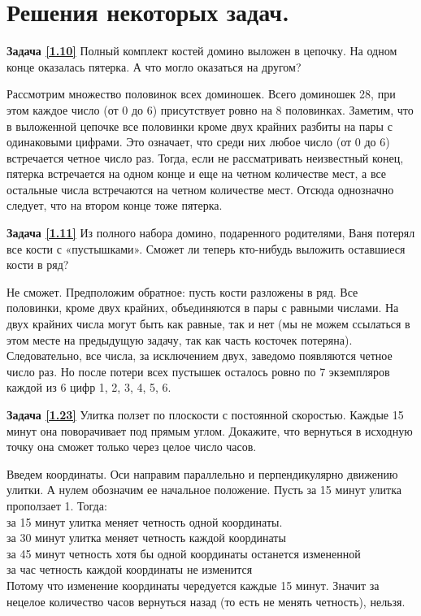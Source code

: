 \section{Решения некоторых задач.}

\textbf{Задача \ref{1.10}}
Полный комплект костей домино выложен в цепочку. На одном конце оказалась пятерка. А что могло оказаться на другом?


\begin{prf}
	Рассмотрим множество половинок всех доминошек. Всего доминошек 28, при этом каждое число (от 0 до 6) присутствует ровно на 8 половинках. Заметим, что в выложенной цепочке все половинки кроме двух крайних разбиты на пары с одинаковыми цифрами. Это означает, что среди них любое число (от 0 до 6) встречается четное число раз. Тогда, если не рассматривать неизвестный конец, пятерка встречается на одном конце и еще на четном количестве мест, а все остальные числа встречаются на четном количестве мест. Отсюда однозначно следует, что на втором конце тоже пятерка.
\end{prf}

\textbf{Задача \ref{1.11}}
Из полного набора домино, подаренного родителями, Ваня потерял все кости с «пустышками». Сможет ли теперь кто-нибудь выложить оставшиеся кости в ряд?

\begin{prf}
	Не сможет. Предположим обратное: пусть кости разложены в ряд. Все половинки, кроме двух крайних, объединяются в пары с равными числами. На двух крайних числа могут быть как равные, так и нет (мы не можем ссылаться в этом месте на предыдущую задачу, так как часть косточек потеряна). Следовательно, все числа, за исключением двух, заведомо появляются четное число раз. Но после потери всех пустышек осталось ровно по 7 экземпляров каждой из 6 цифр 1, 2, 3, 4, 5, 6. 
\end{prf}



\textbf{Задача \ref{1.23}}
Улитка ползет по плоскости с постоянной скоростью. Каждые 15 минут она поворачивает под прямым углом. Докажите, что вернуться в исходную точку она сможет только через целое число часов.
\begin{prf}
	Введем координаты. Оси направим параллельно и перпендикулярно движению улитки. А нулем обозначим ее начальное положение. Пусть за 15 минут улитка проползает 1. Тогда: \\за 15 минут улитка меняет четность одной координаты.\\ за 30 минут улитка меняет четность каждой координаты\\ за 45 минут четность хотя бы одной координаты останется измененной\\ за час четность каждой координаты не изменится\\
	Потому что изменение координаты чередуется каждые 15 минут. Значит за нецелое количество часов вернуться назад (то есть не менять четность), нельзя.
\end{prf}

